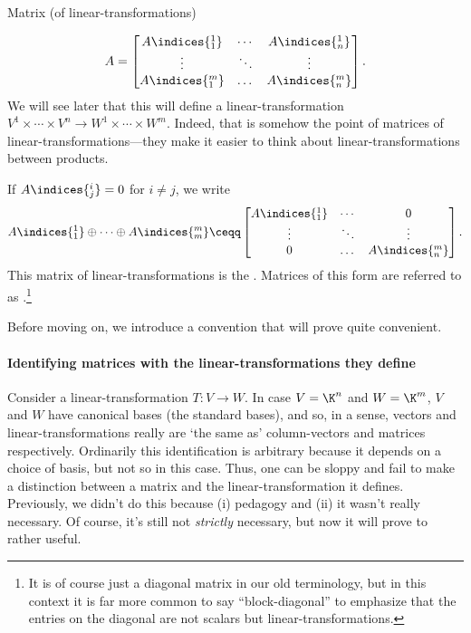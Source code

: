 \begin{dfn}{Matrix (of linear-transformations)}{}
\begin{rmk}
		\begin{equation}
			A=\begin{bmatrix}A\indices{^1_1} & \cdots & A\indices{^1_n} \\ \vdots & \ddots & \vdots \\ A\indices{^m_1} & \dots & A\indices{^m_n}\end{bmatrix}.
		\end{equation}
		We will see later that this will define a linear-transformation $V^1\times \cdots \times V^n\rightarrow W^1\times \cdots \times W^m$.  Indeed, that is somehow the point of matrices of linear-transformations---they make it easier to think about linear-transformations between products.
	\end{rmk}
	\begin{rmk}
		If $A\indices{^i_j}=0$ for $i\neq j$, we write
		\begin{equation}
		A\indices{^1_1}\oplus \cdots \oplus A\indices{^m_m}\ceqq \begin{bmatrix}A\indices{^1_1} & \cdots & 0 \\ \vdots & \ddots & \vdots \\ 0 & \dots & A\indices{^m_n}\end{bmatrix}.
		\end{equation}
		This matrix of linear-transformations is the .  Matrices of this form are referred to as .\footnote{It is of course just a diagonal matrix in our old terminology, but in this context it is far more common to say ``block-diagonal'' to emphasize that the entries on the diagonal are not scalars but linear-transformations.}
	\end{rmk}
\end{dfn}
Before moving on, we introduce a convention that will prove quite convenient.

\paragraph{Identifying matrices with the linear-transformations they define}

Consider a linear-transformation $T\colon V\rightarrow W$.  In case $V=\K ^n$ and $W=\K ^m$, $V$ and $W$ have canonical bases (the standard bases), and so, in a sense, vectors and linear-transformations really are `the same as' column-vectors and matrices respectively.  Ordinarily this identification is arbitrary because it depends on a choice of basis, but not so in this case.  Thus, one can be sloppy and fail to make a distinction between a matrix and the linear-transformation it defines.  Previously, we didn't do this because (i) pedagogy and (ii) it wasn't really necessary.  Of course, it's still not \emph{strictly} necessary, but now it will prove to rather useful.

